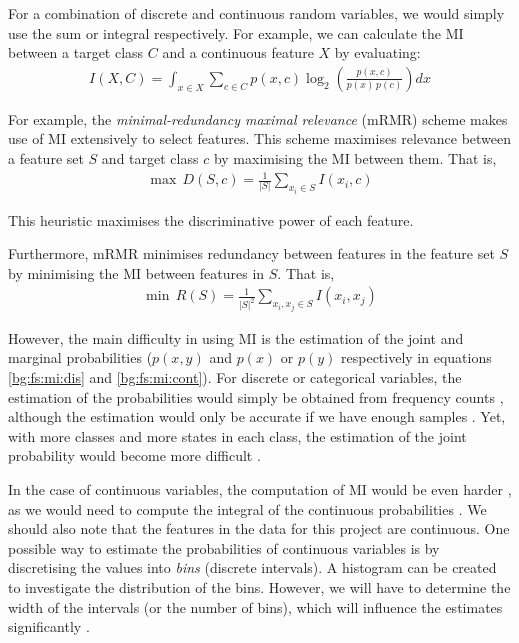 \documentclass[12pt, twoside, a4paper]{report}
\begin{document}
For a combination of discrete and continuous random variables, we would simply use the sum or integral respectively. For example, we can calculate the MI between a target class $C$ and a continuous feature $X$ by evaluating:
\begin{align} \label{bg:fs:mi:contDis}
I(X, C) = \int_{x \in X} \sum_{c \in C} p(x, c) \log_2 \left( \frac{p(x, c)}{p(x) \, p(c)} \right) dx
\end{align}

For example, the \textit{minimal-redundancy maximal relevance} (mRMR) scheme \cite{RefWorks:182} makes use of MI extensively to select features. This scheme maximises relevance between a feature set $S$ and target class $c$ by maximising the MI between them. That is,
\begin{align*}
\max \, D(S, c) = \frac{1}{|S|} \sum_{x_i \in S} I(x_i, c)
\end{align*}

This heuristic maximises the discriminative power of each feature.

Furthermore, mRMR minimises redundancy between features in the feature set $S$ by minimising the MI between features in $S$. That is,
\begin{align*}
\min \, R(S) = \frac{1}{|S|^2} \sum_{x_i, x_j \in S} I(x_i, x_j)
\end{align*}

However, the main difficulty in using MI is the estimation of the joint and marginal probabilities ($p(x, y)$ and $p(x)$ or $p(y)$ respectively in equations \ref{bg:fs:mi:dis} and \ref{bg:fs:mi:cont}). For discrete or categorical variables, the estimation of the probabilities would simply be obtained from frequency counts \cite{RefWorks:183}, although the estimation would only be accurate if we have enough samples \cite{RefWorks:182}. Yet, with more classes and more states in each class, the estimation of the joint probability would become more difficult \cite{RefWorks:140}.

In the case of continuous variables, the computation of MI would be even harder \cite{RefWorks:185}, as we would need to compute the integral of the continuous probabilities \cite{RefWorks:192}. We should also note that the features in the data for this project are continuous. One possible way to estimate the probabilities of continuous variables is by discretising the values into \textit{bins} (discrete intervals). A histogram can be created to investigate the distribution of the bins. However, we will have to determine the width of the intervals (or the number of bins), which will influence the estimates significantly \cite{RefWorks:186}.
\end{document}
